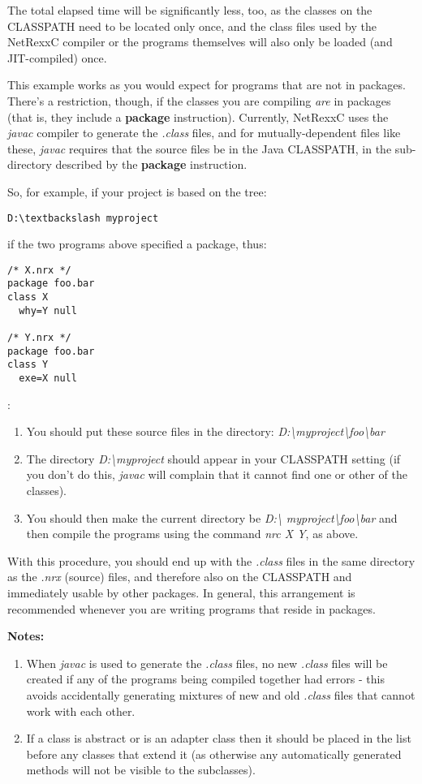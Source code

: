 The total elapsed time will be significantly less, too, as the classes
on the CLASSPATH need to be located only once, and the class files used
by the NetRexxC compiler or the programs themselves will also only be
loaded (and JIT-compiled) once.

This example works as you would expect for programs that are not in
packages.  There's a restriction, though, if the classes you are
compiling \emph{are} in packages (that is, they include a
\textbf{package} instruction).  Currently, NetRexxC uses the \emph{javac}
compiler to generate the \emph{.class} files, and for mutually-dependent
files like these, \emph{javac} requires that the source files be in the
Java CLASSPATH, in the sub-directory described by the \textbf{package}
instruction.


So, for example, if your project is based on the tree:
\begin{verbatim}
D:\textbackslash myproject
\end{verbatim}
 if the two programs above specified a package, thus:
\begin{verbatim}
/* X.nrx */
package foo.bar
class X
  why=Y null

/* Y.nrx */
package foo.bar
class Y
  exe=X null
\end{verbatim}
:

\begin{enumerate}
\item
You should put these source files in the directory:
\emph{D:\textbackslash myproject\textbackslash foo\textbackslash bar}
\item
The directory \emph{D:\textbackslash myproject} should appear in your CLASSPATH
setting (if you don't do this, \emph{javac} will complain that it cannot
find one or other of the classes).
\item
You should then make the current directory be \emph{D:\textbackslash
myproject\textbackslash foo\textbackslash bar}
and then compile the programs using the command \emph{nrc X Y},
as above.
\end{enumerate}

With this procedure, you should end up with the \emph{.class} files in
the same directory as the \emph{.nrx} (source) files, and therefore also
on the CLASSPATH and immediately usable by other packages.  In general,
this arrangement is recommended whenever you are writing programs that
reside in packages.

\textbf{Notes:}
\begin{enumerate}
\item
When \emph{javac} is used to generate the \emph{.class} files, no
new \emph{.class} files will be created if any of the programs being
compiled together had errors - this avoids accidentally generating
mixtures of new and old \emph{.class} files that cannot work with each
other.
\item
If a class is abstract or is an adapter class then it should be placed
in the list before any classes that extend it (as otherwise any
automatically generated methods will not be visible to the subclasses).
\end{enumerate}

